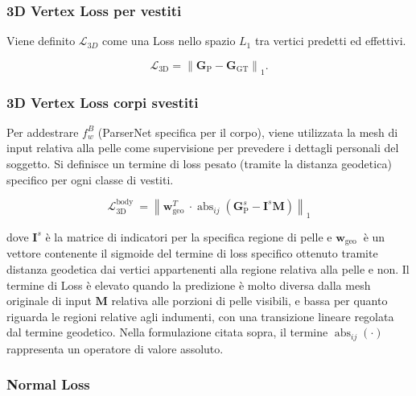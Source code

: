 \subsubsection{3D Vertex Loss per vestiti}

\medskip

Viene definito $\mathcal{L}_{3 D}$ come una Loss nello spazio $L_{1}$ tra vertici predetti ed effettivi.

\medskip

$$
\mathcal{L}_{3 \mathrm{D}}=\left\|\mathbf{G}_{\mathrm{P}}-\mathbf{G}_{\mathrm{GT}}\right\|_{1} .
$$

\medskip

\subsubsection{3D Vertex Loss corpi svestiti}

Per addestrare $f_{w}^{B}$ (ParserNet specifica per il corpo), viene utilizzata la mesh di input relativa alla pelle come supervisione per prevedere i dettagli personali del soggetto. Si definisce un termine di loss pesato (tramite la distanza geodetica) specifico per ogni classe di vestiti. 

\medskip

$$
\mathcal{L}_{3 \mathrm{D}}^{\text {body }}=\left\|\boldsymbol{w}_{\text {geo }}^{T} \cdot \operatorname{abs}_{i j}\left(\mathbf{G}_{\mathrm{P}}^{s}-\mathbf{I}^{s} \mathbf{M}\right)\right\|_{1}
$$

\medskip

dove $\mathbf{I}^{s}$ è la matrice di indicatori per la specifica regione di pelle e $\boldsymbol{w}_{\text {geo }}$ è un vettore contenente il sigmoide del termine di loss specifico ottenuto tramite distanza geodetica dai vertici appartenenti alla regione relativa alla pelle e non. Il termine di Loss è elevato quando la predizione è molto diversa dalla mesh originale di input $\mathbf{M}$ relativa alle porzioni di pelle visibili, e bassa per quanto riguarda le regioni relative agli indumenti, con una transizione lineare regolata dal termine geodetico. Nella formulazione citata sopra, il termine $\operatorname{abs}_{i j}(\cdot)$ rappresenta un operatore di valore assoluto.  
\medskip

\subsubsection{Normal Loss}

\medskip

